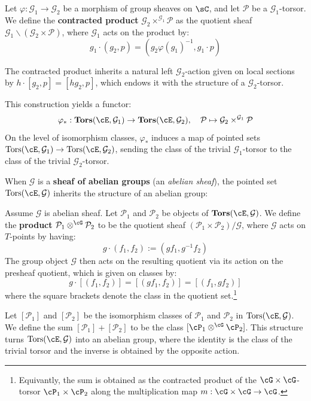 \begin{definition}
Let $\varphi: \mathcal{G}_1 \to \mathcal{G}_2$ be a morphism of group 
sheaves on $\sC$, and let $\mathcal{P}$ be a $\mathcal{G}_1$-torsor. We define the \textbf{contracted product} $\mathcal{G}_2 \times^{\mathcal{G}_1} \mathcal{P}$ as the quotient sheaf $\mathcal{G}_1 \backslash (\mathcal{G}_2 \times \mathcal{P})$, where $\mathcal{G}_1$ acts on the product by:
\[ g_1 \cdot (g_2, p) = (g_2 \varphi(g_1)^{-1}, g_1 \cdot p) \]

The contracted product inherits a natural left $\mathcal{G}_2$-action given on local sections by $h \cdot [g_2, p] = [h g_2, p]$, which endows it with the structure of a $\mathcal{G}_2$-torsor. 
\end{definition}

This construction yields a functor:
\[ \varphi_*: \mathbf{Tors}(\cE, \mathcal{G}_1) \to \mathbf{Tors}(\cE, \mathcal{G}_2), \quad \mathcal{P} \mapsto \mathcal{G}_2 \times^{\mathcal{G}_1} \mathcal{P} \]
On the level of isomorphism classes, $\varphi_*$ induces a map of pointed sets $\mathrm{Tors}(\cE, \mathcal{G}_1) \to \mathrm{Tors}(\cE, \mathcal{G}_2)$, sending the class of the trivial $\mathcal{G}_1$-torsor to the class of the trivial $\mathcal{G}_2$-torsor.

When $\mathcal{G}$ is a \textbf{sheaf of abelian groups} (an \textit{abelian sheaf}), the pointed set $\mathrm{Tors}(\cE, \mathcal{G})$ 
inherits the structure of an abelian group:
\begin{definition}
    Assume $\mathcal{G}$ is abelian sheaf. Let $\mathcal{P}_1$ and $\mathcal{P}_2$ be objects of $\mathbf{Tors}(\cE, \mathcal{G})$. 
    We define the \textbf{product} $\mathcal{P}_1 \otimes^{\cG} \mathcal{P}_2$ to be the quotient sheaf 
    $(\mathcal{P}_1 \times \mathcal{P}_2)/\mathcal{G}$, where $\mathcal{G}$ acts on $T$-points by having:
    \[ g \cdot (f_1, f_2) := (g f_1, g^{-1} f_2) \]
    The group object $\mathcal{G}$ then acts on the resulting quotient via its action on the presheaf quotient, which is given on classes by:
    \[ g \cdot [(f_1, f_2)] = [(g f_1, f_2)] = [(f_1, g f_2)] \]
    where the square brackets denote the class in the quotient set.\footnote{
    Equivantly, the sum is obtained as the contracted product of the $\cG \times \cG$-torsor $\cP_1 \times \cP_2$ along the multiplication map
$m: \cG \times \cG \to \cG$. }
\end{definition}

Let $[\mathcal{P}_1]$ and $[\mathcal{P}_2]$ be the isomorphism classes of $\mathcal{P}_1$ and $\mathcal{P}_2$ in $\mathrm{Tors}(\cE, \mathcal{G})$.
We define the sum $[\mathcal{P}_1] + [\mathcal{P}_2]$ to be the class $[\cP_1 \otimes^{\cG} \cP_2]$.
This structure turns $\mathrm{Tors}(\cE, \mathcal{G})$ into an abelian group, 
where the identity is the class of the trivial torsor and the inverse is obtained by the opposite action.

